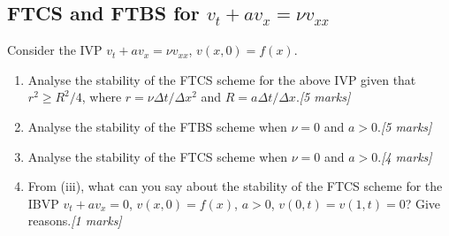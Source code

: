 \documentclass[11pt,a4paper]{article}
\newcommand{\mk}[1]{\hfill\textit{[#1 marks]}}
\begin{document}
\subsection{FTCS and FTBS for \(v_t+av_x=\nu v_{xx}\)}

\begin{qbox}
Consider the IVP \(v_t+av_x=\nu v_{xx}\), \(v(x,0)=f(x)\).
\begin{enumerate}[label=(\roman*)]
  \item Analyse the stability of the FTCS scheme for the above IVP given
    that \(r^2\ge R^2/4\), where \(r=\nu\Delta t/\Delta x^2\) and
    \(R=a\Delta t/\Delta x\).\mk{5}
  \item Analyse the stability of the FTBS scheme when \(\nu=0\) and
    \(a>0\).\mk{5}
  \item Analyse the stability of the FTCS scheme when \(\nu=0\) and
    \(a>0\).\mk{4}
  \item From (iii), what can you say about the stability of the FTCS
    scheme for the IBVP \(v_t+av_x=0\), \(v(x,0)=f(x)\), \(a>0\),
    \(v(0,t)=v(1,t)=0\)?  Give reasons.\mk{1}
\end{enumerate}
\end{qbox}
\end{document}
